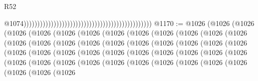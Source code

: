 \begin{lexlean}{R52}
\begin{coremodule}
                                                                                                  @1074)))))))))))))))))))))))))))))))))))))))))))))))
@1170 := @1026
    (@1026
      (@1026
        (@1026
          (@1026
            (@1026
              (@1026
                (@1026
                  (@1026
                    (@1026
                      (@1026
                        (@1026
                          (@1026
                            (@1026
                              (@1026
                                (@1026
                                  (@1026
                                    (@1026
                                      (@1026
                                        (@1026
                                          (@1026
                                            (@1026
                                              (@1026
                                                (@1026
                                                  (@1026
                                                    (@1026
                                                      (@1026
                                                        (@1026
                                                          (@1026
                                                            (@1026
                                                              (@1026
                                                                (@1026
                                                                  (@1026
                                                                    (@1026
                                                                      (@1026
                                                                        (@1026
                                                                          (@1026
                                                                            (@1026
                                                                              (@1026
                                                                                (@1026
                                                                                  (@1026
                                                                                    (@1026
                                                                                      (@1026
                                                                                        (@1026
                                                                                          (@1026
                                                                                            (@1026

\end{coremodule}
\end{lexlean}
